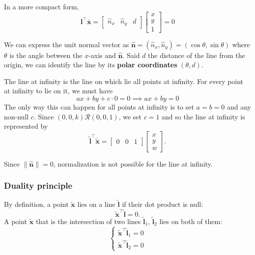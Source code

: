 In a more compact form,
$$\mathbf{l}^{\top} \bar{\mathbf{x}} =
\begin{bmatrix}
\hat{n}_x & \hat{n}_y & d
\end{bmatrix}
\begin{bmatrix}
x \\
y \\
1
\end{bmatrix}
= 0
$$

\begin{observation}{}
    We can express the unit normal vector as $\hat{\mathbf{n}}=(\hat{n}_{x}, \hat{n}_{y})=(\cos \theta, \sin \theta)$ where $\theta$ is the angle between the $x$-axis and $\hat{\mathbf{n}}$. Said $d$ the distance of the line from the origin, we can identify the line by its \textbf{polar coordinates} $(\theta, d)$.
\end{observation}

The line at infinity is the line on which lie all points at infinity. For every point at infinity to lie on it, we must have
$$ax + by + c\cdot0 = 0 \implies ax + by = 0$$
The only way this can happen for all points at infinity is to set $a=b=0$ and any non-null $c$. Since $(0,0,k)\mathcal{R}(0,0,1)$, we set $c=1$ and so the line at infinity is represented by
$$\mathbf{\tilde{l}}^{\top}\tilde{\mathbf{x}} = \begin{bmatrix}
0 & 0 & 1
\end{bmatrix}\begin{bmatrix}
x \\
y \\
w
\end{bmatrix}.$$

Since $\| \hat{\mathbf{n}} \|=0$, normalization is not possible for the line at infinity.

\subsubsection{Duality principle}
By definition, a point $\tilde{\mathbf{x}}$ lies on a line $\tilde{\mathbf{l}}$ if their dot product is null:
$$\tilde{\mathbf{x}}^{\top}\tilde{\mathbf{l}}=0.$$
A point $\tilde{\mathbf{x}}$ that is the intersection of two lines $\tilde{\mathbf{l}}_{1}$, $\tilde{\mathbf{l}}_{2}$ lies on both of them:
$$\begin{cases}
\tilde{\mathbf{x}}^{\top}\tilde{\mathbf{l}}_{1}=0 \\
\tilde{\mathbf{x}}^{\top}\tilde{\mathbf{l}}_{2}=0
\end{cases}$$

